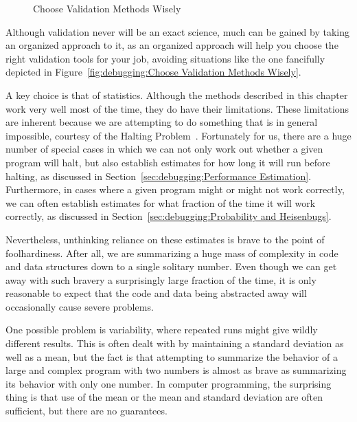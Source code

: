 \begin{figure}[tbhp]
\begin{center}
\end{center}
\caption{Choose Validation Methods Wisely}
\end{figure}

Although validation never will be an exact science, much can be gained
by taking an organized approach to it, as an organized approach will
help you choose the right validation tools for your job, avoiding
situations like the one fancifully depicted in
Figure~\ref{fig:debugging:Choose Validation Methods Wisely}.

A key choice is that of statistics.
Although the methods described in this chapter work very well most of
the time, they do have their limitations.
These limitations are inherent because we are attempting to do something
that is in general impossible, courtesy of the
Halting Problem~\cite{AlanMTuring1937HaltingProblem,GeoffreyKPullum2000HaltingProblem}.
Fortunately for us, there are a huge number of special cases in which
we can not only work out whether a given program will halt, but also
establish estimates for how long it will run before halting, as discussed in
Section~\ref{sec:debugging:Performance Estimation}.
Furthermore, in cases where a given program might or might not work
correctly, we can often establish estimates for what fraction of the
time it will work correctly, as discussed in
Section~\ref{sec:debugging:Probability and Heisenbugs}.

Nevertheless, unthinking reliance on these estimates is brave to the
point of foolhardiness.
After all, we are summarizing a huge mass of complexity in code and
data structures down to a single solitary number.
Even though we can get away with such bravery a surprisingly large
fraction of the time, it is only reasonable to expect that the
code and data being abstracted away will occasionally cause severe
problems.

One possible problem is variability, where repeated runs might give
wildly different results.
This is often dealt with by maintaining a standard deviation as well
as a mean, but the fact is that attempting to summarize the behavior
of a large and complex program with two numbers is almost as brave as
summarizing its behavior with only one number.
In computer programming, the surprising thing is that use of the
mean or the mean and standard deviation are often sufficient, but
there are no guarantees.


